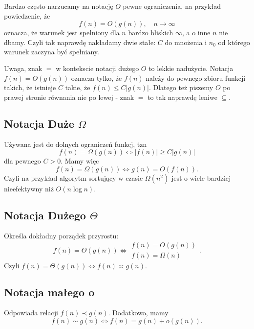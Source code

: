 Bardzo często narzucamy na notację $O$ pewne ograniczenia, na przykład powiedzenie, że
$$f(n)=O(g(n)),\quad n\to \infty$$
oznacza, że warunek jest spełniony dla $n$ bardzo bliskich $\infty$, a o inne $n$ nie dbamy. Czyli tak naprawdę nakładamy dwie stałe: $C$ do mnożenia i $n_0$ od którego warunek zaczyna być spełniany.\bigskip

Uwaga, znak $=$ w kontekscie notacji dużego $O$ to lekkie nadużycie. Notacja $f(n)=O(g(n))$ oznacza tylko, że $f(n)$ należy do pewnego zbioru funkcji takich, że istnieje $C$ takie, że $f(n)\leq C|g(n)|$. Dlatego też piszemy $O$ po prawej stronie równania nie po lewej - znak $=$ to tak naprawdę leniwe $\subseteq$.

\subsection{Notacja Duże $\Omega$}
Używana jest do dolnych ograniczeń funkcj, tzn
$$f(n)=\Omega(g(n))\iff |f(n)|\geq C|g(n)|$$
dla pewnego $C>0$. Mamy więc 
$$f(n)=\Omega(g(n))\iff g(n)=O(f(n)).$$
Czyli na przykład algorytm sortujący w czasie $\Omega(n^2)$ jest o wiele bardziej nieefektywny niż $O(n\log n)$.

\subsection{Notacja Dużego $\Theta$}
Określa dokładny porządek przyrostu:
$$f(n)=\Theta(g(n))\iff \begin{matrix}f(n)=O(g(n))\\f(n)=\Omega(n)\end{matrix}.$$
Czyli $f(n)=\Theta(g(n))\iff f(n)\asymp g(n)$.

\subsection{Notacja małego o}
Odpowiada relacji $f(n)\prec g(n)$. Dodatkowo, mamy
$$f(n)\sim g(n)\iff f(n)=g(n)+o(g(n)).$$